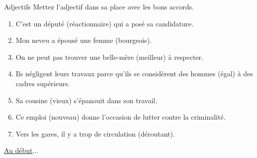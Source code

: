 \begin{frame}{Adjectifs}
  \footnotesize
  Mettez l'adjectif dans sa place avec les bons accords.
  \begin{enumerate}
    \item C'est un \funderline[2cm]{} député  (réactionnaire) qui a posé sa candidature.
    \item Mon neveu a épousé une \funderline[2cm]{} femme  (bourgeois).
    \item On ne peut pas trouver une  belle-mère \funderline[2cm]{} (meilleur) à respecter.
    \item Ils négligent leurs travaux parce qu'ils se considèrent des \funderline[2cm]{} hommes  (égal) à des cadres supérieurs.
    \item Sa  cousine \funderline[2cm]{} (vieux) s'épanouit dans son travail.
    \item Ce  emploi \funderline[2cm]{} (nouveau) donne l'occasion de lutter contre la criminalité.
    \item Vers les gares, il y a trop de \funderline[2cm]{} circulation  (déroutant).
  \end{enumerate}
  \raggedleft\raggedleft\hyperlink{début}{Au début}...
\end{frame}
